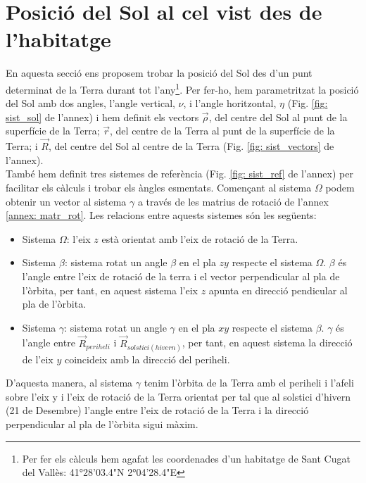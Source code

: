 \documentclass[11pt]{article}
\begin{document}
\section{Posició del Sol al cel vist des de l'habitatge} \label{sec: seccio_2}
En aquesta secció ens proposem trobar la posició del Sol des d'un punt determinat de la Terra durant tot l'any\footnote{\label{nota: habitatge}Per fer els càlculs hem agafat les coordenades d'un habitatge de Sant Cugat del Vallès: 41°28'03.4"N 2°04'28.4"E}. Per fer-ho, hem parametritzat la posició del Sol amb dos angles, l'angle vertical, $\nu$, i l'angle horitzontal, $\eta$ (Fig. \ref{fig: sist_sol} de l'annex) i hem definit els vectors $\vec{\rho}$, del centre del Sol al punt de la superfície de la Terra; $\vec{r}$, del centre de la Terra al punt de la superfície de la Terra; i $\vec{R}$, del centre del Sol al centre de la Terra (Fig. \ref{fig: sist_vectors} de l'annex).\\
També hem definit tres sistemes de referència (Fig. \ref{fig: sist_ref} de l'annex) per facilitar els càlculs i trobar els àngles esmentats. Començant al sistema $\Omega$ podem obtenir un vector al sistema $\gamma$ a través de les matrius de rotació de l'annex \ref{annex: matr_rot}. Les relacions entre aquests sistemes són les següents:
\begin{itemize}
    \item Sistema $\Omega$: l'eix $z$ està orientat amb l'eix de rotació de la Terra.
    \item Sistema $\beta$: sistema rotat un angle $\beta$ en el pla $zy$ respecte el sistema $\Omega$. $\beta$ és l'angle entre l'eix de rotació de la terra i el vector perpendicular al pla de l'òrbita, per tant, en aquest sistema l'eix $z$ apunta en direcció pendicular al pla de l'òrbita.
    \item Sistema $\gamma$: sistema rotat un angle $\gamma$ en el pla $xy$ respecte el sistema $\beta$. $\gamma$ és l'angle entre $\vec{R}_{periheli}$ i $\vec{R}_{solstici(hivern)}$, per tant, en aquest sistema la direcció de l'eix $y$ coincideix amb la direcció del periheli.
\end{itemize}
D'aquesta manera, al sistema $\gamma$ tenim l'òrbita de la Terra amb el periheli i l'afeli sobre l'eix y i l'eix de rotació de la Terra orientat per tal que al solstici d'hivern (21 de Desembre) l'angle entre l'eix de rotació de la Terra i la direcció perpendicular al pla de l'òrbita sigui màxim.
\end{document}
